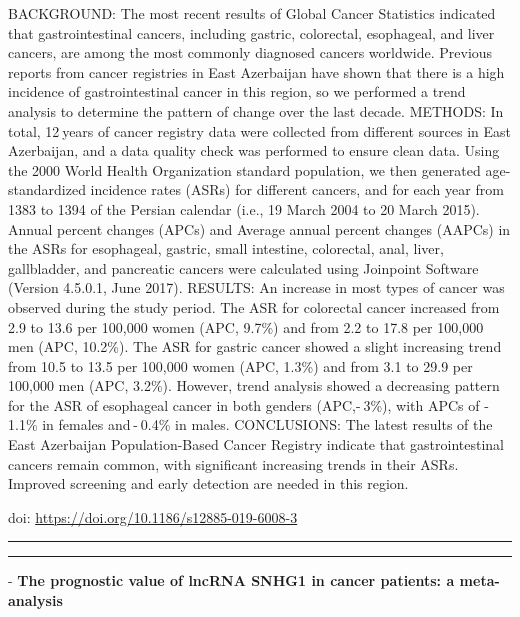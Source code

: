 \documentclass[]{article}
\begin{document}
BACKGROUND: The most recent results of Global Cancer Statistics
indicated that gastrointestinal cancers, including gastric, colorectal,
esophageal, and liver cancers, are among the most commonly diagnosed
cancers worldwide. Previous reports from cancer registries in East
Azerbaijan have shown that there is a high incidence of gastrointestinal
cancer in this region, so we performed a trend analysis to determine the
pattern of change over the last decade. METHODS: In total, 12 years of
cancer registry data were collected from different sources in East
Azerbaijan, and a data quality check was performed to ensure clean data.
Using the 2000 World Health Organization standard population, we then
generated age-standardized incidence rates (ASRs) for different cancers,
and for each year from 1383 to 1394 of the Persian calendar (i.e., 19
March 2004 to 20 March 2015). Annual percent changes (APCs) and Average
annual percent changes (AAPCs) in the ASRs for esophageal, gastric,
small intestine, colorectal, anal, liver, gallbladder, and pancreatic
cancers were calculated using Joinpoint Software (Version 4.5.0.1, June
2017). RESULTS: An increase in most types of cancer was observed during
the study period. The ASR for colorectal cancer increased from 2.9 to
13.6 per 100,000 women (APC, 9.7\%) and from 2.2 to 17.8 per 100,000 men
(APC, 10.2\%). The ASR for gastric cancer showed a slight increasing
trend from 10.5 to 13.5 per 100,000 women (APC, 1.3\%) and from 3.1 to
29.9 per 100,000 men (APC, 3.2\%). However, trend analysis showed a
decreasing pattern for the ASR of esophageal cancer in both genders
(APC,- 3\%), with APCs of - 1.1\% in females and - 0.4\% in males.
CONCLUSIONS: The latest results of the East Azerbaijan Population-Based
Cancer Registry indicate that gastrointestinal cancers remain common,
with significant increasing trends in their ASRs. Improved screening and
early detection are needed in this region.

doi: \url{https://doi.org/10.1186/s12885-019-6008-3}

{}

{}

\begin{center}\rule{0.5\linewidth}{\linethickness}\end{center}

\begin{center}\rule{0.5\linewidth}{\linethickness}\end{center}

 - \textbf{The prognostic value of lncRNA SNHG1 in cancer patients: a
meta-analysis}
\end{document}
